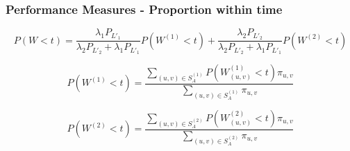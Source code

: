     
        
    
    


\begin{frame}
    \frametitle{Performance Measures - Proportion within time}
    \centering
    
    \small
    \begin{equation*}
        P(W < t) = \frac{\lambda_1 P_{L'_1}}{\lambda_2 P_{L'_2}+\lambda_1 P_{L'_1}} 
        P(W^{(1)} < t) + \frac{\lambda_2 P_{L'_2}}{\lambda_2 P_{L'_2} + 
        \lambda_1 P_{L'_1}}P(W^{(2)} < t) 
    \end{equation*}

    \begin{equation*}
        P(W^{(1)} < t) = \frac{\sum_{(u,v) \in S_A^{(1)}} P(W_{(u,v)}^{(1)} < t) 
        \pi_{u,v} }{\sum_{(u,v) \in S_A^{(1)}} \pi_{u,v}}
    \end{equation*}
    
    
    \begin{equation*}
        P(W^{(2)} < t) = \frac{\sum_{(u,v) \in S_A^{(2)}} P(W_{(u,v)}^{(2)} < t) 
        \pi_{u,v} }{\sum_{(u,v) \in S_A^{(2)}} \pi_{u,v}}
    \end{equation*}
    
\end{frame}


